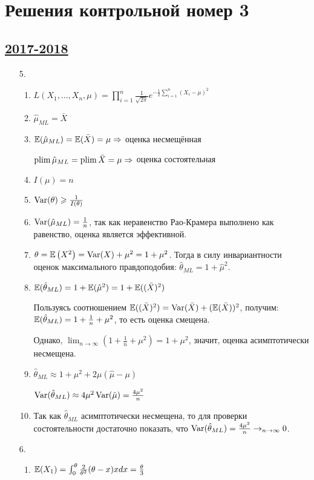 \thispagestyle{empty}
\section{Решения контрольной номер 3}

\subsection[2017-2018]{\hyperref[sec:kr_03_2017_2018]{2017-2018}}
\label{sec:sol_kr_03_2017_2018}


\begin{enumerate}
\item[5.]
\begin{enumerate}
\item $L(X_1, \ldots, X_n, \mu) = \prod_{i=1}^n \frac{1}{\sqrt{2\pi}} e^{-\frac{1}{2}\sum_{i=1}^n (X_i - \mu)^2}$
\item $\hat\mu_{ML} = \bar X$
\item $\operatorname{\mathbb{E}}(\hat\mu_{ML}) = \operatorname{\mathbb{E}}(\bar X) = \mu \Rightarrow$ оценка несмещённая

$\operatorname*{plim} \hat \mu_{ML} = \operatorname*{plim} \bar X = \mu \Rightarrow$ оценка состоятельная
\item $I(\mu) = n$
\item $\operatorname{Var}(\theta) \geqslant \frac{1}{I(\theta)}$
\item $\operatorname{Var}(\hat \mu_{ML}) = \frac{1}{n}$, так как неравенство Рао-Крамера выполнено
как равенство, оценка является эффективной.
\item $\theta = \operatorname{\mathbb{E}}\left(X^2\right) = \operatorname{Var}(X) + \mu^2 = 1 + \mu^2$.
Тогда в силу инвариантности оценок максимального правдоподобия: $\hat\theta_{ML} = 1 + \hat\mu^2$.
\item $\operatorname{\mathbb{E}}(\hat \theta_{ML}) = 1 + \operatorname{\mathbb{E}}(\hat \mu^2) = 1 + \operatorname{\mathbb{E}}((\bar X)^2)$

Пользуясь соотношением $\operatorname{\mathbb{E}}((\bar X)^2) = \operatorname{Var}(\bar X) + (\operatorname{\mathbb{E}}(\bar X))^2$,
получим: $\operatorname{\mathbb{E}}(\hat \theta_{ML}) = 1 + \frac{1}{n} + \mu^2$, то есть оценка смещена.

Однако, $\lim_{n \to \infty} \left(1 + \frac{1}{n} + \mu^2\right) = 1 + \mu^2$, значит,
оценка асимптотически несмещена.
\item $\hat \theta_{ML} \approx 1 + \mu^2 + 2\mu(\hat \mu - \mu)$

$\operatorname{Var}(\hat \theta_{ML}) \approx 4 \mu^2 \operatorname{Var}(\hat \mu) = \frac{4 \mu^2}{n}$
\item Так как $\hat \theta_{ML}$ асимптотически несмещена, то для проверки
состоятельности достаточно показать, что
$\operatorname{Var}(\hat \theta_{ML}) = \frac{4\mu^2}{n} \to_{n \to \infty} 0$.
\end{enumerate}
\item[6.]
\begin{enumerate}
\item $\operatorname{\mathbb{E}}(X_1) = \int_{0}^{\theta} \frac{2}{\theta^2}(\theta - x)x dx = \frac{\theta}{3}$


\end{enumerate}
\end{enumerate}
